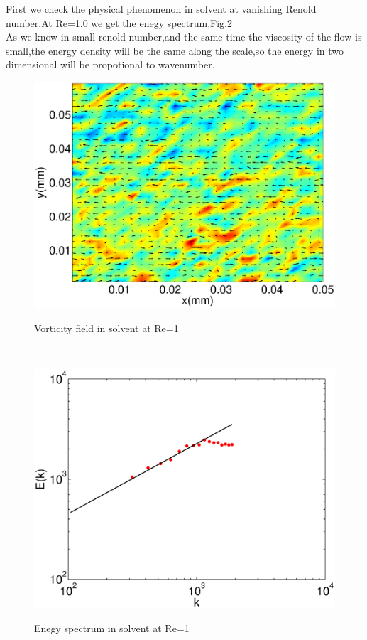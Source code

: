 \documentclass[aps,prl,twocolumn,showpacs,superscriptaddress,groupedaddress]{revtex4}  %
\begin{document}
First we check the physical phenomenon in solvent at vanishing Renold number.At Re=1.0
we get the enegy spectrum,Fig.\ref{fig:spesols}\\As we know in small renold number,and the same time the viscosity of the flow is small,the energy density will be the same 
along the scale,so the energy in two dimensional will be propotional to wavenumber.
\begin{figure}
 \includegraphics[scale=0.5]{vorsols}
\label{fig:spesols}
\caption{Vorticity field in solvent at Re=1}
\end{figure} \\
\begin{figure}
 \includegraphics[scale=0.5]{spesols}
\label{fig:spesols}
\caption{Enegy spectrum in solvent at Re=1}
\end{figure} \\
\end{document}
